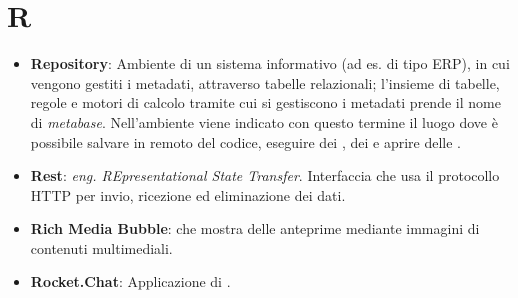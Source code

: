 \section*{R}
\begin{itemize}
	\item
	\textbf{Repository}: Ambiente di un sistema informativo (ad es. di tipo ERP), in cui vengono gestiti i metadati, attraverso tabelle relazionali; l'insieme di tabelle, regole e motori di calcolo tramite cui si gestiscono i metadati prende il nome di \textit{metabase}. Nell'ambiente  viene indicato con questo termine il luogo dove è possibile salvare in remoto del codice, eseguire dei , dei  e aprire delle .
	\item
	\textbf{Rest}: \textit{eng. REpresentational State Transfer}. Interfaccia che usa il protocollo HTTP per invio, ricezione ed eliminazione dei dati.
	\item
	\textbf{Rich Media Bubble}:  che mostra delle anteprime mediante immagini di contenuti multimediali.
	\item
	\textbf{Rocket.Chat}: Applicazione di .
\end{itemize}
\newpage